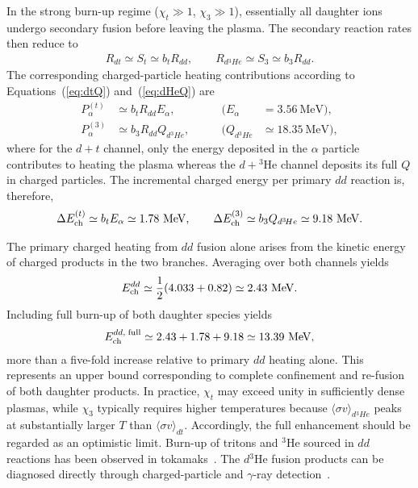 \documentclass[particles,article,accept,pdftex,moreauthors]{Definitions/mdpi}
\begin{document}
In the strong burn-up regime ($\chi_t\gg1$, $\chi_3\gg1$), essentially all daughter ions undergo secondary fusion before leaving the plasma. 
The secondary reaction rates then reduce to
\begin{align}
R_{dt} \simeq S_t \simeq b_t R_{dd},\qquad
R_{d{}^3\!He} \simeq S_3 \simeq b_3 R_{dd}.
\end{align}
The corresponding charged-particle heating contributions according to Equations~(\ref{eq:dtQ}) and~(\ref{eq:dHeQ}) are
\begin{align}
P_{\alpha}^{(t)} &\simeq b_t R_{dd} E_\alpha, 
\qquad &(E_\alpha &= 3.56~\mathrm{MeV}), \\
P_{\alpha}^{(3)} &\simeq b_3 R_{dd} Q_{d{}^3\!He},
\qquad &(Q_{d{}^3\!He}&\simeq 18.35~\mathrm{MeV}),
\end{align}
where for the $d+t$ channel, only the energy deposited in the $\alpha$ particle contributes to heating the plasma whereas the $d+{}^3\mathrm{He}$ channel deposits its full $Q$ in charged particles. The incremental charged energy per primary $dd$ reaction is, therefore,
\begin{align}
\Delta E_{\rm ch}^{(t)}
\simeq b_t E_\alpha
\simeq 1.78~\mathrm{MeV},\qquad
\Delta E_{\rm ch}^{(3)}
\simeq b_3 Q_{d{}^3\!He}
\simeq 9.18~\mathrm{MeV}.
\end{align}

The primary charged heating from $dd$ fusion alone arises from the kinetic energy of charged products in the two branches. Averaging over both channels yields
\begin{align}
E_{\rm ch}^{dd}
\simeq \frac12(4.033 + 0.82)
\simeq 2.43~\mathrm{MeV}.
\end{align}
Including full burn-up of both daughter species yields
\begin{align}
E_{\rm ch}^{dd,\;{\rm full}}
\simeq 2.43 + 1.78 + 9.18
\simeq 13.39~\mathrm{MeV},
\end{align}
more than a five-fold increase relative to primary $dd$ heating alone. This represents an upper bound corresponding to complete confinement and re-fusion of both daughter products. In practice, $\chi_t$ may exceed unity in sufficiently dense plasmas, while $\chi_3$ typically requires higher temperatures because $\langle\sigma v\rangle_{d{}^3\!He}$ peaks at substantially larger $T$ than $\langle\sigma v\rangle_{dt}$. Accordingly, the full enhancement should be regarded as an optimistic limit. Burn-up of tritons and ${}^3\mathrm{He}$ sourced in $dd$ reactions has been observed in tokamaks~\cite{heidbrink1983}. The $d{}^3\mathrm{He}$ fusion products can be diagnosed directly through charged-particle and $\gamma$-ray detection~\cite{sharapov2016}.
\end{document}
